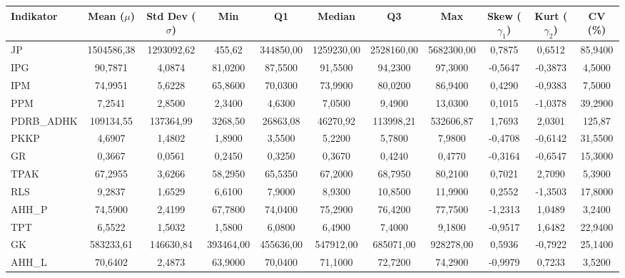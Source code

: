 \begin{adjustbox}{max width=\textwidth}
\small
\begin{tabular}{|>{\centering\arraybackslash}p{2.5cm}|c|c|c|c|c|c|c|c|c|c|}
\hline
\textbf{Indikator} & \textbf{Mean ($\mu$)} & \textbf{Std Dev ($\sigma$)} & \textbf{Min} & \textbf{Q1} & \textbf{Median} & \textbf{Q3} & \textbf{Max} & \textbf{Skew ($\gamma_1$)} & \textbf{Kurt ($\gamma_2$)} & \textbf{CV (\%)} \\
\hline
JP & 1504586,38 & 1293092,62 & 455,62 & 344850,00 & 1259230,00 & 2528160,00 & 5682300,00 & 0,7875 & 0,6512 & 85,9400 \\
IPG & 90,7871 & 4,0874 & 81,0200 & 87,5500 & 91,5500 & 94,2300 & 97,3000 & -0,5647 & -0,3873 & 4,5000 \\
IPM & 74,9951 & 5,6228 & 65,8600 & 70,0300 & 73,9900 & 80,0200 & 86,9400 & 0,4290 & -0,9383 & 7,5000 \\
PPM & 7,2541 & 2,8500 & 2,3400 & 4,6300 & 7,0500 & 9,4900 & 13,0300 & 0,1015 & -1,0378 & 39,2900 \\
PDRB\_ADHK & 109134,55 & 137364,99 & 3268,50 & 26863,08 & 46270,92 & 113998,21 & 532606,87 & 1,7693 & 2,0301 & 125,87 \\
PKKP & 4,6907 & 1,4802 & 1,8900 & 3,5500 & 5,2200 & 5,7800 & 7,9800 & -0,4708 & -0,6142 & 31,5500 \\
GR & 0,3667 & 0,0561 & 0,2450 & 0,3250 & 0,3670 & 0,4240 & 0,4770 & -0,3164 & -0,6547 & 15,3000 \\
TPAK & 67,2955 & 3,6266 & 58,2950 & 65,5350 & 67,2000 & 68,7950 & 80,2100 & 0,7021 & 2,7090 & 5,3900 \\
RLS & 9,2837 & 1,6529 & 6,6100 & 7,9000 & 8,9300 & 10,8500 & 11,9900 & 0,2552 & -1,3503 & 17,8000 \\
AHH\_P & 74,5900 & 2,4199 & 67,7800 & 74,0400 & 75,2900 & 76,4200 & 77,7500 & -1,2313 & 1,0489 & 3,2400 \\
TPT & 6,5522 & 1,5032 & 1,5800 & 6,0800 & 6,4900 & 7,4000 & 9,1800 & -0,9517 & 1,6482 & 22,9400 \\
GK & 583233,61 & 146630,84 & 393464,00 & 455636,00 & 547912,00 & 685071,00 & 928278,00 & 0,5936 & -0,7922 & 25,1400 \\
AHH\_L & 70,6402 & 2,4873 & 63,9000 & 70,0400 & 71,1000 & 72,7200 & 74,2900 & -0,9979 & 0,7233 & 3,5200 \\
\hline
\end{tabular}
\end{adjustbox}
